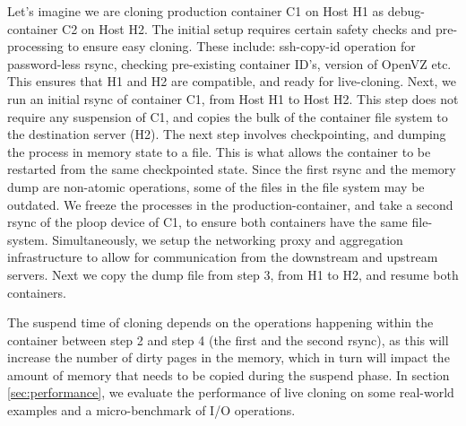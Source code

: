 Let's imagine we are cloning production container C1 on Host H1 as debug-container C2 on Host H2. 
The initial setup requires certain safety checks and pre-processing to ensure easy cloning. 
These include: ssh-copy-id operation for password-less rsync, checking pre-existing container ID's, version of OpenVZ etc. 
This ensures that H1 and H2 are compatible, and ready for live-cloning.
Next, we run an initial rsync of container C1, from Host H1 to Host H2. 
This step does not require any suspension of C1, and copies the bulk of the container file system to the destination server (H2). 
The next step involves checkpointing, and dumping the process in memory state to a file.
This is what allows the container to be restarted from the same checkpointed state. 
Since the first rsync and the memory dump are non-atomic operations, some of the files in the file system may be outdated.
We freeze the processes in the production-container, and take a second rsync of the ploop device of C1, to ensure both containers have the same file-system. 
Simultaneously, we setup the networking proxy and aggregation infrastructure to allow for communication from the downstream and upstream servers.
Next we copy the dump file from step 3, from H1 to H2, and resume both containers.

The suspend time of cloning depends on the operations happening within the container between step 2 and step 4 (the first and the second rsync), as this will increase the number of dirty pages in the memory, which in turn will impact the amount of memory that needs to be copied during the suspend phase.
In section \ref{sec:performance}, we evaluate the performance of live cloning on some real-world examples and a micro-benchmark of I/O operations. 

